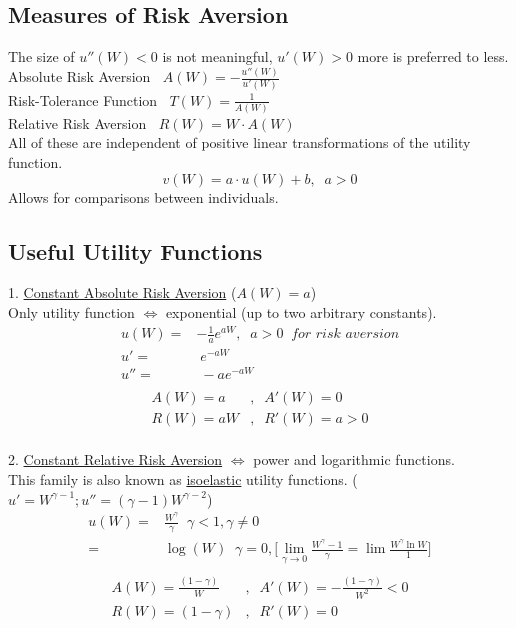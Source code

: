 \documentclass[
14pt,notheorems,hyperref={pdfauthor=whatever}
]{beamer}
\begin{document}
\subsection{Measures of Risk Aversion}
\begin{frame}
The size of $u''(W)<0$ is not meaningful, $u'(W)>0$ more is preferred to less.\\
\hfill \break
Absolute Risk Aversion $\;\;A(W) = -\frac{u''(W)}{u'(W)}$\\
\hfill \break
Risk-Tolerance Function $\;\;T(W) = \frac{1}{A(W)}$\\
\hfill \break
Relative Risk Aversion $\;\;R(W) = W\cdot A(W)$\\
\hfill \break
All of these are independent of positive linear transformations of the utility function.\\
\[v(W)=a\cdot u(W)+b,\;\;a>0\]
Allows for comparisons between individuals.
\end{frame}

\subsection{Useful Utility Functions}
\begin{frame}
1. \underline{Constant Absolute Risk Aversion} ($A(W) = a$)\\
Only utility function $\iff$ exponential (up to two arbitrary constants).
\hfill \break
\begin{align*}
    u(W) =& -\frac{1}{a} e^{aW},\;\;a>0 \;\;\textit{for risk aversion}\\
    u' =& \;e^{-aW}\\
    u''=&\;-ae^{-aW}\\
\end{align*}
\begin{align*}
    A(W) = a&,\;\;A'(W) = 0\\
    R(W) = aW&,\;\;R'(W) = a > 0\\
\end{align*}
\end{frame}

\begin{frame}
2. \underline{Constant Relative Risk Aversion} $\iff$ power and logarithmic functions.\\
This family is also known as \underline{isoelastic} utility functions. ($u'=W^{\gamma-1}; u'' = (\gamma-1)W^{\gamma-2}$)\\
\hfill \break
\begin{align*}
    u(W) =& \frac{W^{\gamma}}{\gamma}\;\;\gamma<1,\gamma\neq0\\
    =& \log(W)\;\;\gamma=0,\Bigg[\lim_{\gamma \to 0} \frac{W^\gamma-1}{\gamma}=\lim\frac{W^\gamma \ln{W}}{1}\Bigg]\\
\end{align*}
\begin{align*}
    A(W) = \frac{(1-\gamma)}{W}&,\;\;A'(W) = -\frac{(1-\gamma)}{W^2}<0\\
    R(W) = (1-\gamma)&,\;\;R'(W) = 0\\
\end{align*}
\end{frame}
\end{document}
